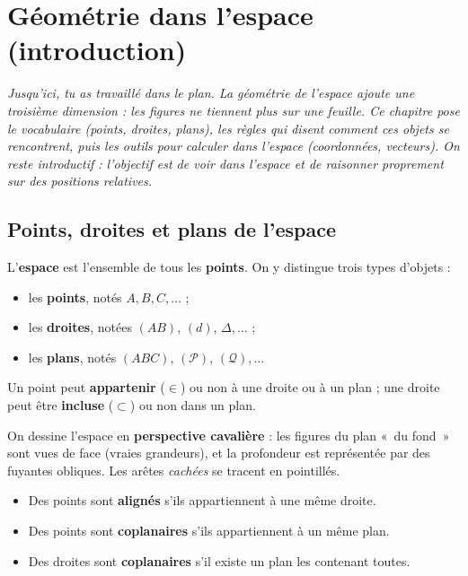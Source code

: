 \chapter{Géométrie dans l'espace (introduction)}
\textit{Jusqu'ici, tu as travaillé dans le plan. La géométrie de l'espace ajoute une
troisième dimension : les figures ne tiennent plus sur une feuille. Ce chapitre pose
le vocabulaire (points, droites, plans), les règles qui disent comment ces objets se
rencontrent, puis les outils pour calculer dans l'espace (coordonnées, vecteurs). On
reste \emph{introductif} : l'objectif est de \og voir dans l'espace\fg{} et de
raisonner proprement sur des positions relatives.}

\section{Points, droites et plans de l'espace}

\begin{definition}
L'\textbf{espace} est l'ensemble de tous les \textbf{points}. On y distingue trois
types d'objets :
\begin{itemize}
  \item les \textbf{points}, notés $A,B,C,\dots$ ;
  \item les \textbf{droites}, notées $(AB)$, $(d)$, $\Delta,\dots$ ;
  \item les \textbf{plans}, notés $(ABC)$, $(\mathcal{P})$, $(\mathcal{Q}),\dots$
\end{itemize}
Un point peut \textbf{appartenir} ($\in$) ou non à une droite ou à un plan ; une
droite peut être \textbf{incluse} ($\subset$) ou non dans un plan.
\end{definition}

\begin{remarque}
On dessine l'espace en \textbf{perspective cavalière} : les figures du plan «~du
fond~» sont vues de face (vraies grandeurs), et la profondeur est représentée par des
fuyantes obliques. Les arêtes \emph{cachées} se tracent en pointillés.
\end{remarque}

\begin{aretenir}
\begin{itemize}
  \item Des points sont \textbf{alignés} s'ils appartiennent à une même droite.
  \item Des points sont \textbf{coplanaires} s'ils appartiennent à un même plan.
  \item Des droites sont \textbf{coplanaires} s'il existe un plan les contenant toutes.
\end{itemize}
\end{aretenir}

